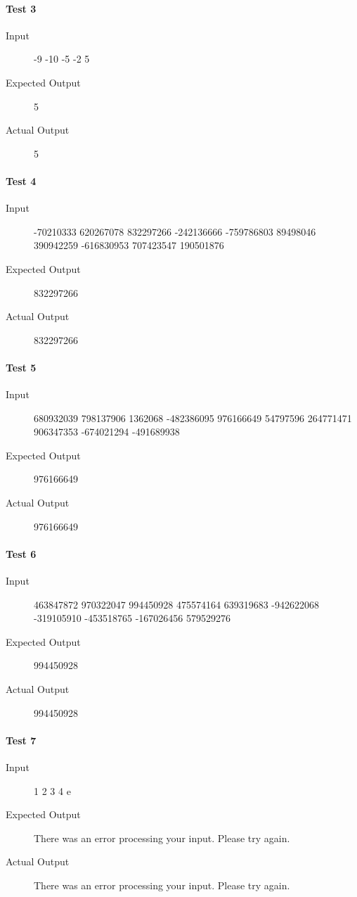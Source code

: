 \documentclass[12pt,a4paper,onesided]{report}
\begin{document}
	\paragraph{Test 3}
		\begin{description}
			\item[Input] -9 -10 -5 -2 5
			\item[Expected Output] 5
			\item[Actual Output] 5			
		\end{description}
	\paragraph{Test 4}
	\begin{description}
		\item[Input] -70210333 620267078 832297266 -242136666 -759786803 89498046 390942259 -616830953 707423547 190501876
		\item[Expected Output] 832297266
		\item[Actual Output] 832297266			
	\end{description}		
	\paragraph{Test 5}
	\begin{description}
		\item[Input] 680932039 798137906 1362068 -482386095 976166649 54797596 264771471 906347353 -674021294 -491689938
		\item[Expected Output] 976166649
		\item[Actual Output] 976166649		
	\end{description}		
	\paragraph{Test 6}
	\begin{description}
		\item[Input] 463847872 970322047 994450928 475574164 639319683 -942622068 -319105910 -453518765 -167026456 579529276
		\item[Expected Output] 994450928
		\item[Actual Output] 994450928			
	\end{description}
	\paragraph{Test 7}
	\begin{description}
		\item[Input] 1 2 3 4 e
		\item[Expected Output] There was an error processing your input. Please try again.
		\item[Actual Output] There was an error processing your input. Please try again.			
	\end{description}
\end{document}
